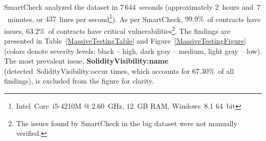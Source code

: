 SmartCheck analyzed the dataset in $7\,644$~seconds (approximately $2$~hours and~$7$~minutes, or $437$~lines per second\footnote{Intel~Core~i5-4210M @ 2.60~GHz, 12~GB RAM, Windows~8.1 64~bit}).
As per SmartCheck, $99.9\%$~of contracts have issues, $63.2\%$~of contracts have critical vulnerabilities\footnote{The issues found by SmartCheck in the big dataset were not manually verified.}.
The findings are presented in Table~\ref{MassiveTestingTable} and Figure~\ref{MassiveTestingFigure} (colors denote severity levels: black -- high, dark gray -- medium, light gray -- low).
The most prevalent issue, \textbf{\let\letcs\texapiletcs \usevalue SolidityVisibility:name \let\letcs\etoolboxletcs} (detected~{\let\letcs\texapiletcs \usevalue SolidityVisibility:occur \let\letcs\etoolboxletcs} times, which accounts for $67.30\%$~of all findings), is excluded from the figure for clarity.

